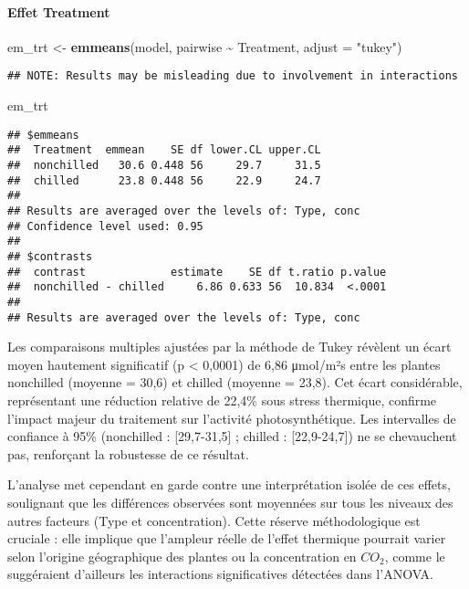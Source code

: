 \documentclass[
]{article}
\newenvironment{Shaded}{\begin{snugshade}}{\end{snugshade}}
\newcommand{\AttributeTok}[1]{\textcolor[rgb]{0.13,0.29,0.53}{#1}}
\newcommand{\FunctionTok}[1]{\textcolor[rgb]{0.13,0.29,0.53}{\textbf{#1}}}
\newcommand{\NormalTok}[1]{#1}
\newcommand{\OtherTok}[1]{\textcolor[rgb]{0.56,0.35,0.01}{#1}}
\newcommand{\SpecialCharTok}[1]{\textcolor[rgb]{0.81,0.36,0.00}{\textbf{#1}}}
\newcommand{\StringTok}[1]{\textcolor[rgb]{0.31,0.60,0.02}{#1}}
\begin{document}
\paragraph{Effet Treatment}\label{effet-treatment}

\begin{Shaded}
\begin{Highlighting}[]
\NormalTok{em\_trt }\OtherTok{\textless{}{-}} \FunctionTok{emmeans}\NormalTok{(model, pairwise }\SpecialCharTok{\textasciitilde{}}\NormalTok{ Treatment, }\AttributeTok{adjust =} \StringTok{"tukey"}\NormalTok{)}
\end{Highlighting}
\end{Shaded}

\begin{verbatim}
## NOTE: Results may be misleading due to involvement in interactions
\end{verbatim}

\begin{Shaded}
\begin{Highlighting}[]
\NormalTok{em\_trt}
\end{Highlighting}
\end{Shaded}

\begin{verbatim}
## $emmeans
##  Treatment  emmean    SE df lower.CL upper.CL
##  nonchilled   30.6 0.448 56     29.7     31.5
##  chilled      23.8 0.448 56     22.9     24.7
## 
## Results are averaged over the levels of: Type, conc 
## Confidence level used: 0.95 
## 
## $contrasts
##  contrast             estimate    SE df t.ratio p.value
##  nonchilled - chilled     6.86 0.633 56  10.834  <.0001
## 
## Results are averaged over the levels of: Type, conc
\end{verbatim}

Les comparaisons multiples ajustées par la méthode de Tukey révèlent un
écart moyen hautement significatif (p \textless{} 0,0001) de 6,86
μmol/m²s entre les plantes nonchilled (moyenne = 30,6) et chilled
(moyenne = 23,8). Cet écart considérable, représentant une réduction
relative de 22,4\% sous stress thermique, confirme l'impact majeur du
traitement sur l'activité photosynthétique. Les intervalles de confiance
à 95\% (nonchilled : {[}29,7-31,5{]} ; chilled : {[}22,9-24,7{]}) ne se
chevauchent pas, renforçant la robustesse de ce résultat.

L'analyse met cependant en garde contre une interprétation isolée de ces
effets, soulignant que les différences observées sont moyennées sur tous
les niveaux des autres facteurs (Type et concentration). Cette réserve
méthodologique est cruciale : elle implique que l'ampleur réelle de
l'effet thermique pourrait varier selon l'origine géographique des
plantes ou la concentration en \(CO_2\), comme le suggéraient d'ailleurs
les interactions significatives détectées dans l'ANOVA.
\end{document}

